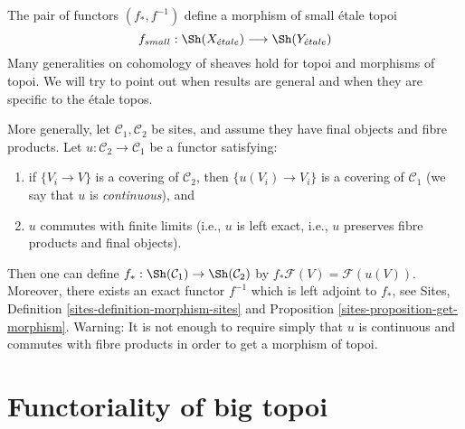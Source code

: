 \noindent
The pair of functors $(f_*, f^{-1})$ define a morphism of small \'etale topoi
$$
f_{small} :
\Sh(X_{\acute{e}tale})
\longrightarrow
\Sh(Y_{\acute{e}tale})
$$
Many generalities on cohomology of sheaves hold for topoi and
morphisms of topoi. We will try to point out when results are
general and when they are specific to the \'etale topos.

\begin{remark}
\label{remark-functoriality-general}
More generally, let $\mathcal{C}_1, \mathcal{C}_2$ be sites, and
assume they have final objects and fibre products. Let
$u: \mathcal{C}_2 \to \mathcal{C}_1$ be a functor satisfying:
\begin{enumerate}
\item if $\{V_i \to V\}$ is a covering of $\mathcal{C}_2$, then
$\{u(V_i) \to V_i\}$ is a covering of $\mathcal{C}_1$ (we
say that $u$ is {\it continuous}), and
\item $u$ commutes with finite limits (i.e., $u$ is left exact, i.e.,
$u$ preserves fibre products and final objects).
\end{enumerate}
Then one can define
$f_*: \Sh(\mathcal{C}_1) \to \Sh(\mathcal{C}_2)$
by $ f_* \mathcal{F}(V) = \mathcal{F}(u(V))$.
Moreover, there exists an exact functor $f^{-1}$ which
is left adjoint to $f_*$, see
Sites, Definition \ref{sites-definition-morphism-sites} and
Proposition \ref{sites-proposition-get-morphism}.
Warning: It is not enough to require simply that $u$ is continuous
and commutes with fibre products in order to get a morphism of topoi.
\end{remark}




\section{Functoriality of big topoi}
\label{section-functoriality-big-topoi}

